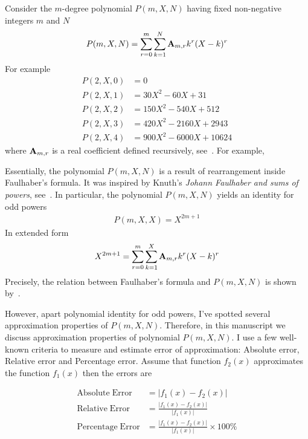 Consider the $m$-degree polynomial $P(m, X, N)$ having fixed non-negative integers $m$ and $N$
\begin{align*}
    P(m,X,N) = \sum_{r=0}^{m} \sum_{k=1}^{N} {\mathbf{A}} \sb{m,r} k^r (X-k)^r
\end{align*}
For example
\begin{align*}
    P(2,X,0) &= 0 \\
    P(2,X,1) &= 30X^2 - 60X + 31 \\
    P(2,X,2) &= 150X^2 - 540X + 512 \\
    P(2,X,3) &= 420X^2 - 2160X + 2943 \\
    P(2,X,4) &= 900X^2 - 6000X + 10624
\end{align*}
where ${\mathbf{A}} \sb{m,r}$ is a real coefficient defined recursively, see~\cite{alekseyev2018mathoverflow,
    on_the_link_between_binomial_theorem_and_discrete_convolution, unusual_identity_for_odd_powers,
    history_and_overview_of_polynomial_p}.
For example,


Essentially, the polynomial $P(m, X, N)$ is a result of rearrangement inside Faulhaber's formula.
It was inspired by Knuth's \textit{Johann Faulhaber and sums of powers}, see~\cite{knuth1993johann}.
In particular, the polynomial $P(m, X, N)$ yields an identity for odd powers
\begin{align*}
    P(m, X, X) = X^{2m+1}
\end{align*}
In extended form
\begin{align*}
    X^{2m+1} = \sum_{r=0}^{m} \sum_{k=1}^{X} {\mathbf{A}} \sb{m,r} k^r (X-k)^r
\end{align*}
Precisely, the relation between Faulhaber's formula and $P(m,X,N)$ is shown by~\cite{kolosov2025unexpected}.

However, apart polynomial identity for odd powers, I've spotted several approximation properties of $P(m,X,N)$.
Therefore, in this manuscript we discuss approximation properties of polynomial $P(m,X,N)$.
I use a few well-known criteria to measure and estimate error of approximation: Absolute error, Relative error and
Percentage error.
Assume that function $f_2(x)$ approximates the function $f_1 (x)$ then the errors are

\begin{align*}
    \mathrm{Absolute \; Error}   &= \lvert f_1(x) - f_2(x) \rvert \\
    \mathrm{Relative \; Error}   &= \frac{\lvert f_1(x) - f_2(x) \rvert}{\lvert f_1(x) \rvert} \\
    \mathrm{Percentage \; Error} &= \frac{\lvert f_1(x) - f_2(x) \rvert}{\lvert f_1(x) \rvert} \times 100\%
\end{align*}

